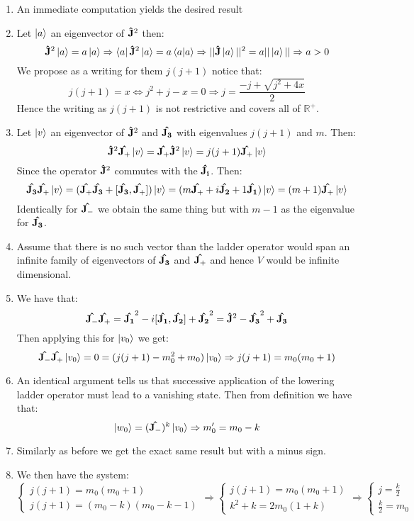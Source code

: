 \documentclass[10pt,a4paper]{book}
\begin{document}
\begin{enumerate}

\item An immediate computation yields the desired result

\item Let $\ket{a}$ an eigenvector of $\vu{J}^2$ then:
\[
\vu{J}^2 \ket{a} = a \ket{a} \Rightarrow \bra{a} \vu{J}^2 \ket{a} = a \braket{a} \Rightarrow || \vu{J} \ket{a} ||^2 = a || \ket{a} || \Rightarrow a > 0
\]
We propose as a writing for them $j(j+1)$ notice that:
\[
j(j+1) = x \Leftrightarrow j^2 + j - x = 0 \Rightarrow j = \frac{-j + \sqrt{j^2 + 4 x}}{2}
\]
Hence the writing as $j(j+1)$ is not restrictive and covers all of $\mathbb{R}^+$.

\item Let $\ket{v}$ an eigenvector of $\vu{J}^2$ and $\vu{J_3}$ with eigenvalues $j(j+1)$ and $m$. Then:
\[
\vu{J}^2 \vu{J_+} \ket{v} = \vu{J_+}\vu{J}^2 \ket{v} = j (j + 1) \vu{J_+} \ket{v}
\]
Since the operator $\vu{J}^2$ commutes with the $\vu{J_i}$. Then:
\[
\vu{J_3} \vu{J_+} \ket{v} = (\vu{J_+} \vu{J_3} + [\vu{J_3}, \vu{J_+}] )\ket{v} = (m \vu{J_+} + i\vu{J_2} + 1 \vu{J_1}) \ket{v} = ( m + 1 ) \vu{J_+} \ket{v}  
\]
Identically for $\vu{J_-}$ we obtain the same thing but with $m - 1$ as the eigenvalue for $\vu{J_3}$.

\item Assume that there is no such vector than the ladder operator would span an infinite family of eigenvectors of $\vu{J_3}$ and $\vu{J_+}$ and hence $V$ would be infinite dimensional.

\item We have that:
\[
\vu{J_-}\vu{J_+} = \vu{J_1}^2 - i [\vu{J_1}, \vu{J_2}] + \vu{J_2}^2 = \vu{J}^2 - \vu{J_3}^2 + \vu{J_3}
\]
Then applying this for $\ket{v_0}$ we get:
\[
\vu{J_-}\vu{J_+}\ket{v_0} = 0 = (j(j + 1) - m_0^2 + m_0) \ket{v_0} \Rightarrow j(j+1) = m_0(m_0 + 1) 
\]

\item An identical argument tells us that successive application of the lowering ladder operator must lead to a vanishing state. Then from definition we have that:
\[
\ket{w_0} = (\vu{J_-})^k \ket{v_0} \Rightarrow m'_0 = m_0 - k
\]

\item Similarly as before we get the exact same result but with a minus sign.

\item We then have the system:
\[
\begin{cases}
j(j+1) = m_0 (m_0 + 1)\\
j(j + 1) = (m_0 - k) (m_0 - k - 1)
\end{cases}
\Rightarrow
\begin{cases}
j(j+1) = m_0(m_0 + 1)\\
k^2 + k = 2 m_0( 1 +  k)
\end{cases}
\Rightarrow
\begin{cases}
j = \frac{k}{2}\\
\frac{k}{2} = m_0
\end{cases}
\]


\end{enumerate}
\end{document}
